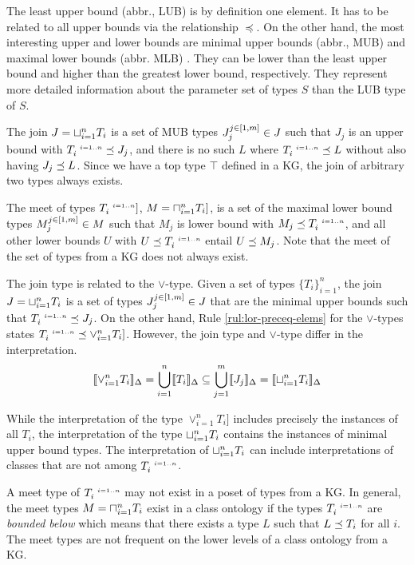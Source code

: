 \documentclass[runningheads]{llncs}
\newcommand{\s}{\scriptscriptstyle\ \,}
\newcommand{\llb}{\llbracket}
\newcommand{\rrb}{\rrbracket}
\begin{document}
The least upper bound (abbr., LUB) is by definition one element. It has
to be related to all upper bounds via the relationship $\preceq$. On
the other hand, the most interesting upper and lower bounds are
minimal upper bounds (abbr., MUB) and maximal lower bounds (abbr. MLB)
\cite{Knudstorp2024}. They can be lower than the least upper bound and
higher than the greatest lower bound, respectively. They represent
more detailed information about the parameter set of types $S$ than
the LUB type of $S$.

The join $J=\sqcup_{i=1}^n\/T_i$ is a set of MUB types
$J_j^{j\in[1,m]}\in\/J$ such that $J_j$ is an upper bound with
$T_i^{\s\/i=1..n}\preceq\/J_j$, and there is no such $L$ where
$T_i^{\s\/i=1..n}\preceq\/L$ without also having $J_j\preceq\/L$. Since
we have a top type $\top$ defined in a KG, the join of arbitrary two
types always exists.

The meet of types $T_i^{\s\/i=1..n}]$, $M=\sqcap_{i=1}^n\/T_i]$, is
a set of the maximal lower bound types $M_j^{j\in[1,m]}\in\/M$ such
that $M_j$ is lower bound with $M_j\preceq\/T_i^{\s\/i=1..n}$, and all
other lower bounds $U$ with $U\preceq\/T_i^{\s\/i=1..n}$ entail
$U\preceq\/M_j$. Note that the meet of the set of types from a KG does
not always exist.

The join type is related to the $\lor$-type. Given a set of types
$\{T_i\}_{i=1}^n$, the join $J=\sqcup_{i=1}^n\/T_i$ is a set of types
$J_j^{j\in[1,m]}\in\/J$ that are the minimal upper bounds such that
$T_i^{\s\/i=1..n}\preceq\/J_j$. On the other hand, Rule
\ref{rul:lor-preceq-elems} for the $\lor$-types states
$T_i^{\s\/i=1..n}\preceq\lor_{i=1}^n\/T_i]$. However, the join type and $\lor$-type
differ in the interpretation.
$$\llb\lor_{i=1}^n\/T_i\rrb_\D=\bigcup_{i=1}^n\llb\/T_i\rrb_\D\subseteq\bigcup_{j=1}^m\llb\/J_j\rrb_\D=\llb\sqcup_{i=1}^n\/T_i\rrb_\D$$

While the interpretation of the type $\lor_{i=1}^nT_i]$ includes
precisely the instances of all $T_i$, the interpretation of the type
$\sqcup_{i=1}^n\/T_i$ contains the instances of minimal upper bound
types. The interpretation of $\sqcup_{i=1}^n\/T_i$ can include
interpretations of classes that are not among $T_i^{\s\/i=1..n}$.

A meet type of $T_i^{\s\/i=1..n}$ may not exist in a poset of types
from a KG. In general, the meet types $M=\sqcap_{i=1}^n\/T_i$
exist in a class ontology if the types $T_i^{\s\/i=1..n}$ are
\emph{bounded below} \cite{Pierce2002} which means that there exists a
type $L$ such that $L\preceq\/T_i$ for all $i$. The meet types are not
frequent on the lower levels of a class ontology from a KG.
\end{document}

